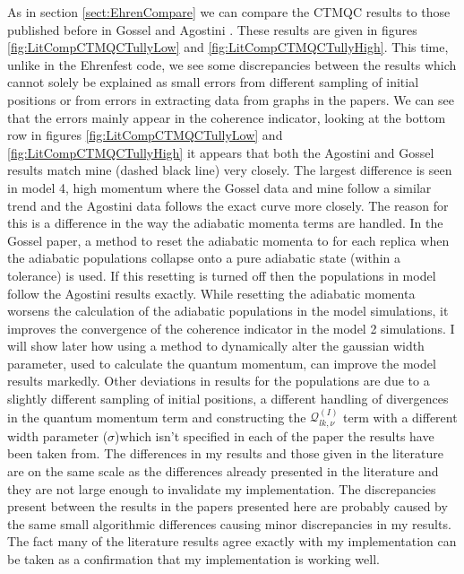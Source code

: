 As in section \ref{sect:EhrenCompare} we can compare the CTMQC results to those published before in Gossel \cite{gossel_coupled-trajectory_2018} and Agostini \cite{agostini_quantum-classical_2016}. These results are given in figures \ref{fig:LitCompCTMQCTullyLow} and \ref{fig:LitCompCTMQCTullyHigh}. This time, unlike in the Ehrenfest code, we see some discrepancies between the  results which cannot solely be explained as small errors from different sampling of initial positions or from errors in extracting data from graphs in the papers. We can see that the errors mainly appear in the coherence indicator, looking at the bottom row in figures \ref{fig:LitCompCTMQCTullyLow} and \ref{fig:LitCompCTMQCTullyHigh} it appears that both the Agostini and Gossel results match mine (dashed black line) very closely. The largest difference is seen in model 4, high momentum where the Gossel data and mine follow a similar trend and the Agostini data follows the exact curve more closely. The reason for this is a difference in the way the adiabatic momenta terms are handled. In the Gossel paper,  a method to reset the adiabatic momenta to  for each replica when the adiabatic populations collapse onto a pure adiabatic state (within a tolerance) is used. If this resetting is turned off then the populations in model  follow the Agostini results exactly. While resetting the adiabatic momenta worsens the calculation of the adiabatic populations in the model  simulations, it improves the convergence of the coherence indicator in the model 2 simulations. I will show later how using a method to dynamically alter the gaussian width parameter, used to calculate the quantum momentum, can improve the model  results markedly. Other deviations in results for the populations are due to a slightly different sampling of initial positions, a different handling of divergences in the quantum momentum term and constructing the $\mathcal{Q}_{lk, \nu}^{(I)}$ term with a different width parameter ($\sigma$)\replace{ -}{, }which isn't specified in each of the paper the results have been taken from. The differences in my results and those given in the literature are on the same scale as the differences already presented in the literature and they are not large enough to invalidate my implementation. The discrepancies present between the results in the papers presented here are probably caused by the same small algorithmic differences causing minor discrepancies in my results. The fact many of the literature results agree exactly with my implementation can be taken as a confirmation that my implementation is working well. 

